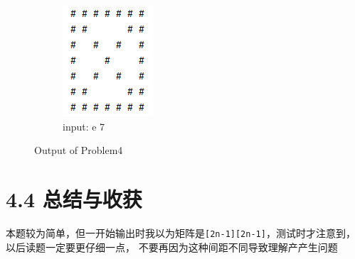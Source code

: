 \begin{figure}[H]
\begin{subfigure}{0.19\linewidth}
		\includegraphics[width=1\linewidth]{../pic/4/4.e.png}
        \caption{input: e 7}
	\end{subfigure}
    \caption{Output of Problem4}
\end{figure}

\section{4.4 总结与收获}

本题较为简单，但一开始输出时我以为矩阵是\lstinline{[2n-1][2n-1]}，测试时才注意到，以后读题一定要更仔细一点，
不要再因为这种间距不同导致理解产产生问题